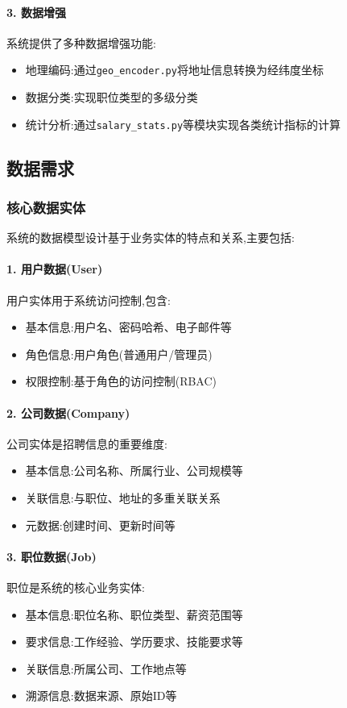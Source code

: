 \paragraph{3. 数据增强}
系统提供了多种数据增强功能:
\begin{itemize}
    \item 地理编码:通过\texttt{geo\_encoder.py}将地址信息转换为经纬度坐标
    \item 数据分类:实现职位类型的多级分类
    \item 统计分析:通过\texttt{salary\_stats.py}等模块实现各类统计指标的计算
\end{itemize}

\subsection{数据需求}

\subsubsection{核心数据实体}

系统的数据模型设计基于业务实体的特点和关系,主要包括:

\paragraph{1. 用户数据(User)}
用户实体用于系统访问控制,包含:
\begin{itemize}
    \item 基本信息:用户名、密码哈希、电子邮件等
    \item 角色信息:用户角色(普通用户/管理员)
    \item 权限控制:基于角色的访问控制(RBAC)
\end{itemize}

\paragraph{2. 公司数据(Company)}
公司实体是招聘信息的重要维度:
\begin{itemize}
    \item 基本信息:公司名称、所属行业、公司规模等
    \item 关联信息:与职位、地址的多重关联关系
    \item 元数据:创建时间、更新时间等
\end{itemize}

\paragraph{3. 职位数据(Job)}
职位是系统的核心业务实体:
\begin{itemize}
    \item 基本信息:职位名称、职位类型、薪资范围等
    \item 要求信息:工作经验、学历要求、技能要求等
    \item 关联信息:所属公司、工作地点等
    \item 溯源信息:数据来源、原始ID等
\end{itemize}


